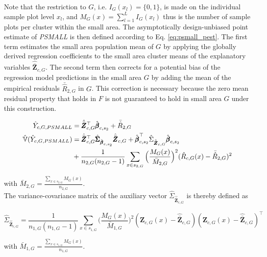 Note that the restriction to $G$, i.e. $I_{G}(x_l)=\{0,1\}$, is made on the individual sample plot level $x_l$, and $M_{G}(x) = \sum_{l=1}^{L}I_{G}(x_l)$ thus is the number of sample plots per cluster within the small area. The asymptotically design-unbiased point estimate of \textit{PSMALL} is then defined according to Eq. \ref{eq:psmall_pest}. The first term estimates the small area population mean of $G$ by applying the globally derived regression coefficients to the small area cluster means of the explanatory variables $\hat{\bar{\pmb{Z}}}_{c,G}$. The second term then corrects for a potential bias of the regression model predictions in the small area $G$ by adding the mean of the empirical residuals $\bar{\hat{R}}_{2,G}$ in $G$. This correction is necessary because the zero mean residual property that holds in $F$ is not guaranteed to hold in small area $G$ under this construction.

\begin{subequations}\label{eq:psmall}
	\begin{align}
	\hat{Y}_{c,G,PSMALL} &= \hat{\bar{\pmb{Z}}}_{c,G}^{\top}\hat{\pmb{\beta}}_{c,s_2} + \bar{\hat{R}}_{2,G} \label{eq:psmall_pest} \\
	\hat{\mathbb{V}}(\hat{Y}_{c,G,PSMALL}) & = \hat{\bar{\pmb{Z}}}_{c,G}^{\top}\hat{\pmb{\Sigma}}_{\hat{\pmb{\beta}}_{c,s_2}}\hat{\bar{\pmb{Z}}}_{c,G}
	+ \hat{\pmb{\beta}}_{c,s_2}^{\top}\hat{\Sigma}_{\hat{\bar{\pmb{Z}}}_{c,G}}\hat{\pmb{\beta}}_{c,s_2} \nonumber \\
	& + \frac{1}{n_{2,G}(n_{2,G}-1)}\sum_{x \in s_{2,G}}\Big(\frac{M_{G}(x)}{\bar{M}_{2,G}}\Big)^2(\hat{R}_{c,G}(x) - \bar{\hat{R}}_{2,G})^2
	\label{eq:psmallvar}
	\end{align}
\end{subequations}

\noindent with $\bar{M}_{2,G}=\frac{\sum_{x \in s_{2,G}}M_{G}(x)}{n_{2,G}}$.\\

The variance-covariance matrix of the auxiliary vector $\hat{\Sigma}_{\hat{\bar{\pmb{Z}}}_{c,G}}$ is thereby defined as

\begin{equation}\label{estvarcovaux_G}
\hat{\Sigma}_{\hat{\bar{\pmb{Z}}}_{c,G}} = \frac{1}{n_{1,G}(n_{1,G}-1)} \sum_{x \in s_{1,G}} \big(\frac{M_{G}(x)}{\bar{M}_{1,G}}\big)^2 (\pmb{Z}_{c,G}(x)-\hat{\bar{\pmb{Z}}}_{c,G})(\pmb{Z}_{c,G}(x)-\hat{\bar{\pmb{Z}}}_{c,G})^{\top}
\end{equation}

\noindent with $\bar{M}_{1,G}=\frac{\sum_{x \in s_{1,G}}M_{G}(x)}{n_{1,G}}$.\\

